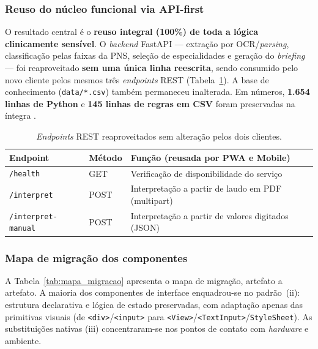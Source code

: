 \documentclass[12pt]{article}
\begin{document}
\subsubsection{Reuso do núcleo funcional via API-first}

O resultado central é o \textbf{reuso integral (100\%) de toda a lógica
clinicamente sensível}. O \emph{backend} FastAPI --- extração por OCR/\emph{parsing},
classificação pelas faixas da PNS, seleção de especialidades e geração do
\emph{briefing} --- foi reaproveitado \textbf{sem uma única linha reescrita}, sendo
consumido pelo novo cliente pelos mesmos três \emph{endpoints} REST
(Tabela~\ref{tab:endpoints}). A base de conhecimento (\texttt{data/*.csv}) também
permaneceu inalterada. Em números, \textbf{1.654 linhas de Python} e \textbf{145
linhas de regras em CSV} foram preservadas na íntegra \cite{rampinelli2026}.

\begin{table}[H]
\centering
\caption{\emph{Endpoints} REST reaproveitados sem alteração pelos dois clientes.}
\label{tab:endpoints}
\footnotesize
\begin{tabular}{|l|l|p{6.2cm}|}
\hline
\textbf{Endpoint} & \textbf{Método} & \textbf{Função (reusada por PWA e Mobile)} \\ \hline
\texttt{/health} & GET & Verificação de disponibilidade do serviço \\ \hline
\texttt{/interpret} & POST & Interpretação a partir de laudo em PDF (multipart) \\ \hline
\texttt{/interpret-manual} & POST & Interpretação a partir de valores digitados (JSON) \\ \hline
\end{tabular}
\end{table}

\subsubsection{Mapa de migração dos componentes}

A Tabela~\ref{tab:mapa_migracao} apresenta o mapa de migração, artefato a
artefato. A maioria dos componentes de interface enquadrou-se no padrão~(ii):
estrutura declarativa e lógica de estado preservadas, com adaptação apenas das
primitivas visuais (de \texttt{<div>}/\texttt{<input>} para
\texttt{<View>}/\texttt{<TextInput>}/\texttt{StyleSheet}). As substituições
nativas (iii) concentraram-se nos pontos de contato com \emph{hardware} e ambiente.
\end{document}
